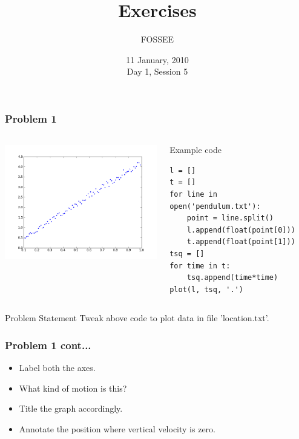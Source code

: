 \documentclass[14pt,compress]{beamer}
\title[Exercises]{Exercises}
\author[FOSSEE] {FOSSEE}
\institute[IIT Bombay] {Department of Aerospace Engineering\\IIT Bombay}
\date[] {11 January, 2010\\Day 1, Session 5}
\newcounter{time}
\begin{document}
\begin{frame}
  \titlepage
\end{frame}


\begin{frame}[fragile]
  \frametitle{Problem 1}
  \begin{columns}
    \hspace*{-0.5in}
    \includegraphics[height=2in, interpolate=true]{data/L-Tsq.png}
    \begin{block}{Example code}
    \tiny
    \begin{lstlisting}
l = []
t = []
for line in open('pendulum.txt'):
    point = line.split()
    l.append(float(point[0]))
    t.append(float(point[1]))
tsq = []
for time in t:
    tsq.append(time*time)
plot(l, tsq, '.')
    \end{lstlisting}
    \end{block}
  \end{columns}
  \begin{block}{Problem Statement}
    Tweak above code to plot data in file 'location.txt'.
  \end{block}
\end{frame}

\begin{frame}
  \frametitle{Problem 1 cont...}
  \begin{itemize}
  \item Label both the axes.
  \item What kind of motion is this?
  \item Title the graph accordingly.
  \item Annotate the position where vertical velocity is zero.
  \end{itemize}
\end{frame}
\end{document}
